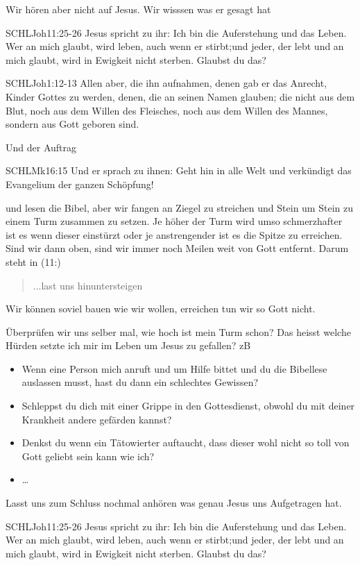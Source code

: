 \documentclass[14pt]{../../inc/mybib}
\newcommand{\q}[1]{\blockquote{#1}}
\newenvironment{block}[1][]{%
  \vspace{1.5em}%
  \noindent\textbf{#1}\par%
  \vspace{0.0em}%
}{%
  \vspace{1em}%
}
\begin{document}
\begin{block}
    Wir hören aber nicht auf Jesus. Wir wisssen was er gesagt hat 
    \begin{bibelbox}{SCHL}{Joh}{11:25-26}
        Jesus spricht zu ihr: Ich bin die Auferstehung und das Leben. Wer an mich glaubt, wird leben, auch wenn er stirbt;und jeder, der lebt und an mich glaubt, wird in Ewigkeit nicht sterben. Glaubst du das?
    \end{bibelbox} 
    \begin{bibelbox}{SCHL}{Joh}{1:12-13}
        Allen aber, die ihn aufnahmen, denen gab er das Anrecht, Kinder Gottes zu werden, denen, die an seinen Namen glauben;
        die nicht aus dem Blut, noch aus dem Willen des Fleisches, noch aus dem Willen des Mannes, sondern aus Gott geboren sind.
    \end{bibelbox}     
    Und der Auftrag
    \begin{bibelbox}{SCHL}{Mk}{16:15}
        Und er sprach zu ihnen: Geht hin in alle Welt und verkündigt das Evangelium der ganzen Schöpfung!
    \end{bibelbox} 
    und lesen die Bibel, aber wir fangen an Ziegel zu streichen und Stein um Stein zu einem Turm zusammen zu setzen. Je höher der Turm wird umso schmerzhafter ist es wenn dieser einstürzt oder je anstrengender ist es die Spitze zu erreichen. Sind wir dann oben, sind wir immer noch Meilen weit von Gott entfernt. Darum steht in (11:) \q{...last uns hinuntersteigen}. Wir können soviel bauen wie wir wollen, erreichen tun wir so Gott nicht.

    Überprüfen wir uns selber mal, wie hoch ist mein Turm schon? Das heisst welche Hürden setzte ich mir im Leben um Jesus zu gefallen? zB 
    \begin{itemize}
        \item Wenn eine Person mich anruft und um Hilfe bittet und du die Bibellese auslassen musst, hast du dann ein schlechtes Gewissen?
        \item Schleppst du dich mit einer Grippe in den Gottesdienst, obwohl du mit deiner Krankheit andere gefärden kannst?
        \item Denkst du wenn ein Tätowierter auftaucht, dass dieser wohl nicht so toll von Gott geliebt sein kann wie ich?
        \item \dots
    \end{itemize}          
\end{block}
    Lasst uns zum Schluss nochmal anhören was genau Jesus uns Aufgetragen hat. \begin{bibelbox}{SCHL}{Joh}{11:25-26}
        Jesus spricht zu ihr: Ich bin die Auferstehung und das Leben. Wer an mich glaubt, wird leben, auch wenn er stirbt;und jeder, der lebt und an mich glaubt, wird in Ewigkeit nicht sterben. Glaubst du das?
    \end{bibelbox} 
\end{document}
